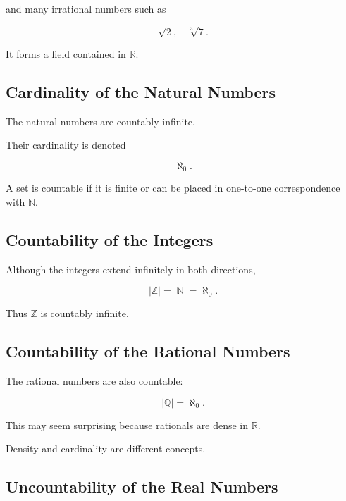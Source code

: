 and many irrational numbers such as

\[
\boxed{
\sqrt2,
\quad
\sqrt[3]{7}.
}
\]

It forms a field contained in \(\mathbb{R}\).

\subsection{Cardinality of the Natural Numbers}
\label{subsec:natural-number-cardinality}

The natural numbers are countably infinite.

Their cardinality is denoted

\[
\boxed{
\aleph_0.
}
\]

A set is countable if it is finite or can be placed in one-to-one
correspondence with \(\mathbb{N}\).

\subsection{Countability of the Integers}
\label{subsec:integer-countability-reference}

Although the integers extend infinitely in both directions,

\[
\boxed{
|\mathbb{Z}|
=
|\mathbb{N}|
=
\aleph_0.
}
\]

Thus \(\mathbb{Z}\) is countably infinite.

\subsection{Countability of the Rational Numbers}
\label{subsec:rational-countability-reference}

The rational numbers are also countable:

\[
\boxed{
|\mathbb{Q}|
=
\aleph_0.
}
\]

This may seem surprising because rationals are dense in \(\mathbb{R}\).

Density and cardinality are different concepts.

\subsection{Uncountability of the Real Numbers}
\label{subsec:real-uncountability-reference}


